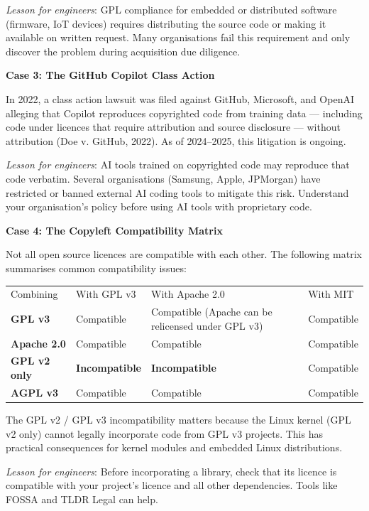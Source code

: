 \documentclass[11pt,a4paper]{book}
\begin{document}
\textit{Lesson for engineers}: GPL compliance for embedded or distributed software (firmware, IoT devices) requires distributing the source code or making it available on written request. Many organisations fail this requirement and only discover the problem during acquisition due diligence.

\textbf{Case 3: The GitHub Copilot Class Action}

In 2022, a class action lawsuit was filed against GitHub, Microsoft, and OpenAI alleging that Copilot reproduces copyrighted code from training data --- including code under licences that require attribution and source disclosure --- without attribution (Doe v. GitHub, 2022). As of 2024--2025, this litigation is ongoing.

\textit{Lesson for engineers}: AI tools trained on copyrighted code may reproduce that code verbatim. Several organisations (Samsung, Apple, JPMorgan) have restricted or banned external AI coding tools to mitigate this risk. Understand your organisation's policy before using AI tools with proprietary code.

\textbf{Case 4: The Copyleft Compatibility Matrix}

Not all open source licences are compatible with each other. The following matrix summarises common compatibility issues:

\begin{tabular}{llll}
\hline
Combining & With GPL v3 & With Apache 2.0 & With MIT \\
\textbf{GPL v3} & Compatible & Compatible (Apache can be relicensed under GPL v3) & Compatible \\
\textbf{Apache 2.0} & Compatible & Compatible & Compatible \\
\textbf{GPL v2 only} & \textbf{Incompatible} & \textbf{Incompatible} & Compatible \\
\textbf{AGPL v3} & Compatible & Compatible & Compatible \\
\hline
\end{tabular}

The GPL v2 / GPL v3 incompatibility matters because the Linux kernel (GPL v2 only) cannot legally incorporate code from GPL v3 projects. This has practical consequences for kernel modules and embedded Linux distributions.

\textit{Lesson for engineers}: Before incorporating a library, check that its licence is compatible with your project's licence and all other dependencies. Tools like FOSSA and TLDR Legal can help.
\end{document}
